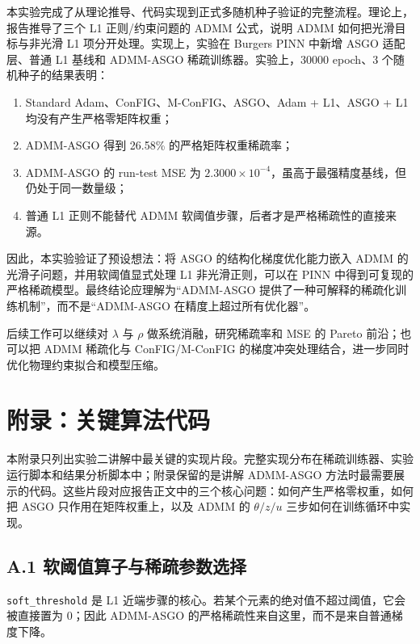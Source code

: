 \documentclass[UTF8,a4paper,12pt,fontset=none]{ctexart}
\begin{document}
本实验完成了从理论推导、代码实现到正式多随机种子验证的完整流程。理论上，报告推导了三个 L1 正则/约束问题的 ADMM 公式，说明 ADMM 如何把光滑目标与非光滑 L1 项分开处理。实现上，实验在 Burgers PINN 中新增 ASGO 适配层、普通 L1 基线和 ADMM-ASGO 稀疏训练器。实验上，30000 epoch、3 个随机种子的结果表明：

\begin{enumerate}
\item Standard Adam、ConFIG、M-ConFIG、ASGO、Adam + L1、ASGO + L1 均没有产生严格零矩阵权重；
\item ADMM-ASGO 得到 26.58\% 的严格矩阵权重稀疏率；
\item ADMM-ASGO 的 run-test MSE 为 $2.3000\times 10^{-4}$，虽高于最强精度基线，但仍处于同一数量级；
\item 普通 L1 正则不能替代 ADMM 软阈值步骤，后者才是严格稀疏性的直接来源。
\end{enumerate}

因此，本实验验证了预设想法：将 ASGO 的结构化梯度优化能力嵌入 ADMM 的光滑子问题，并用软阈值显式处理 L1 非光滑正则，可以在 PINN 中得到可复现的严格稀疏模型。最终结论应理解为“ADMM-ASGO 提供了一种可解释的稀疏化训练机制”，而不是“ADMM-ASGO 在精度上超过所有优化器”。

后续工作可以继续对 $\lambda$ 与 $\rho$ 做系统消融，研究稀疏率和 MSE 的 Pareto 前沿；也可以把 ADMM 稀疏化与 ConFIG/M-ConFIG 的梯度冲突处理结合，进一步同时优化物理约束拟合和模型压缩。

\newpage
\section{附录：关键算法代码}

本附录只列出实验二讲解中最关键的实现片段。完整实现分布在稀疏训练器、实验运行脚本和结果分析脚本中；附录保留的是讲解 ADMM-ASGO 方法时最需要展示的代码。这些片段对应报告正文中的三个核心问题：如何产生严格零权重，如何把 ASGO 只作用在矩阵权重上，以及 ADMM 的 $\theta/z/u$ 三步如何在训练循环中实现。

\subsection{A.1 软阈值算子与稀疏参数选择}

\texttt{soft\_threshold} 是 L1 近端步骤的核心。若某个元素的绝对值不超过阈值，它会被直接置为 0；因此 ADMM-ASGO 的严格稀疏性来自这里，而不是来自普通梯度下降。
\end{document}
